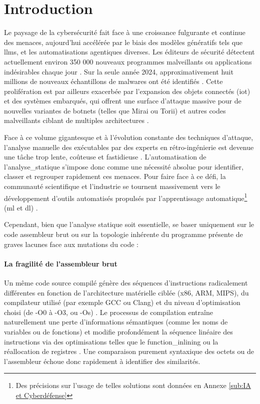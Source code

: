 \section{Introduction}

Le paysage de la cybersécurité fait face à une croissance fulgurante et continue des menaces, aujourd'hui accélérée par le biais des modèles génératifs tels que \glspl{llm}, et les automatisations agentiques diverses.
Les éditeurs de sécurité détectent actuellement environ 350 000 nouveaux programmes malveillants ou applications indésirables chaque jour \cite{kmeans_2025, orcas_2025}.
Sur la seule année 2024, approximativement huit millions de nouveaux échantillons de malwares ont été identifiés \cite{orcas_2025}.
Cette prolifération est par ailleurs exacerbée par l'expansion des objets connectés (\gls{iot}) et des systèmes embarqués, qui offrent une surface d'attaque massive pour de nouvelles variantes de botnets (telles que Mirai ou Torii) et autres codes malveillants ciblant de multiples architectures \cite{heterogeneous_dataset}.

Face à ce volume gigantesque et à l'évolution constante des techniques d'attaque, l'analyse manuelle des exécutables par des experts en rétro-ingénierie est devenue une tâche trop lente, coûteuse et fastidieuse \cite{artuso_thesis, bayer_dynamic}.
L'automatisation de l'\gls{analyse_statique} s'impose donc comme une nécessité absolue pour identifier, classer et regrouper rapidement ces menaces.
Pour faire face à ce défi, la communauté scientifique et l'industrie se tournent massivement vers le développement d'outils automatisés propulsés par l'apprentissage automatique\footnote{Des précisions sur l'usage de telles solutions sont données en Annexe \ref{sub:IA et Cyberdéfense}} (\gls{ml} et \gls{dl}) \cite{artuso_thesis}.


Cependant, bien que l'analyse statique soit essentielle, se baser uniquement sur le code assembleur brut ou sur la topologie inhérente du programme présente de graves lacunes face aux mutations du code :

\paragraph{La fragilité de l'assembleur brut} 
Un même code source compilé génère des séquences d'instructions radicalement différentes en fonction de l'architecture matérielle ciblée (x86, ARM, MIPS), du compilateur utilisé (par exemple GCC ou Clang) et du niveau d'optimisation choisi (de -O0 à -O3, ou -Os) \cite{ruan_survey_2024, luo_semantics_2017}.
Le processus de compilation entraîne naturellement une perte d'informations sémantiques (comme les noms de variables ou de fonctions) et modifie profondément la séquence linéaire des instructions via des optimisations telles que le \gls{function_inlining} ou la réallocation de registres \cite{ruan_survey_2024, luo_semantics_2017}.
Une comparaison purement syntaxique des octets ou de l'assembleur échoue donc rapidement à identifier des similarités.


